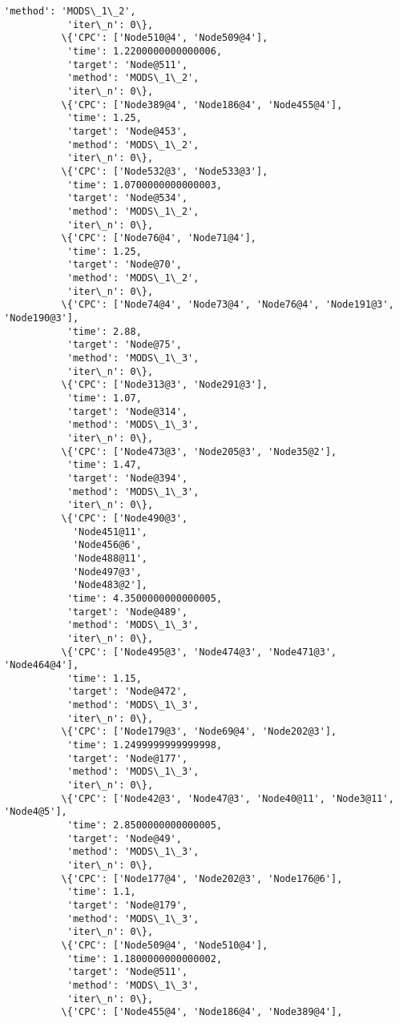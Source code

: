 \documentclass[11pt]{article}
\begin{document}
\begin{Verbatim}[commandchars=\\\{\}]
           'method': 'MODS\_1\_2',
           'iter\_n': 0\},
          \{'CPC': ['Node510@4', 'Node509@4'],
           'time': 1.2200000000000006,
           'target': 'Node@511',
           'method': 'MODS\_1\_2',
           'iter\_n': 0\},
          \{'CPC': ['Node389@4', 'Node186@4', 'Node455@4'],
           'time': 1.25,
           'target': 'Node@453',
           'method': 'MODS\_1\_2',
           'iter\_n': 0\},
          \{'CPC': ['Node532@3', 'Node533@3'],
           'time': 1.0700000000000003,
           'target': 'Node@534',
           'method': 'MODS\_1\_2',
           'iter\_n': 0\},
          \{'CPC': ['Node76@4', 'Node71@4'],
           'time': 1.25,
           'target': 'Node@70',
           'method': 'MODS\_1\_2',
           'iter\_n': 0\},
          \{'CPC': ['Node74@4', 'Node73@4', 'Node76@4', 'Node191@3', 'Node190@3'],
           'time': 2.88,
           'target': 'Node@75',
           'method': 'MODS\_1\_3',
           'iter\_n': 0\},
          \{'CPC': ['Node313@3', 'Node291@3'],
           'time': 1.07,
           'target': 'Node@314',
           'method': 'MODS\_1\_3',
           'iter\_n': 0\},
          \{'CPC': ['Node473@3', 'Node205@3', 'Node35@2'],
           'time': 1.47,
           'target': 'Node@394',
           'method': 'MODS\_1\_3',
           'iter\_n': 0\},
          \{'CPC': ['Node490@3',
            'Node451@11',
            'Node456@6',
            'Node488@11',
            'Node497@3',
            'Node483@2'],
           'time': 4.3500000000000005,
           'target': 'Node@489',
           'method': 'MODS\_1\_3',
           'iter\_n': 0\},
          \{'CPC': ['Node495@3', 'Node474@3', 'Node471@3', 'Node464@4'],
           'time': 1.15,
           'target': 'Node@472',
           'method': 'MODS\_1\_3',
           'iter\_n': 0\},
          \{'CPC': ['Node179@3', 'Node69@4', 'Node202@3'],
           'time': 1.2499999999999998,
           'target': 'Node@177',
           'method': 'MODS\_1\_3',
           'iter\_n': 0\},
          \{'CPC': ['Node42@3', 'Node47@3', 'Node40@11', 'Node3@11', 'Node4@5'],
           'time': 2.8500000000000005,
           'target': 'Node@49',
           'method': 'MODS\_1\_3',
           'iter\_n': 0\},
          \{'CPC': ['Node177@4', 'Node202@3', 'Node176@6'],
           'time': 1.1,
           'target': 'Node@179',
           'method': 'MODS\_1\_3',
           'iter\_n': 0\},
          \{'CPC': ['Node509@4', 'Node510@4'],
           'time': 1.1800000000000002,
           'target': 'Node@511',
           'method': 'MODS\_1\_3',
           'iter\_n': 0\},
          \{'CPC': ['Node455@4', 'Node186@4', 'Node389@4'],

\end{Verbatim}
\end{document}

